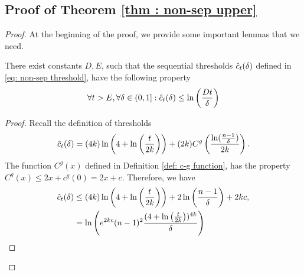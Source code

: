     


\subsection{Proof of Theorem \ref{thm : non-sep upper}}

\nonsepUpperBound*

\begin{proof}
        At the beginning of the proof, we provide some important lemmas that we need.
    


    
    \begin{lemma} \label{lem: thresholds upper bound}
        There exist constants $D,E$, such that the sequential thresholds $\hat{c}_t(\delta)$ defined in \eqref{eq: non-sep threshold}, have the following property
        \begin{align*}
            \forall t > E, \forall \delta \in (0,1]: \hat{c}_t(\delta) \leq \ln \left( \frac{Dt}{\delta} \right)
        \end{align*}
    \end{lemma}
    \begin{proof}
    Recall the definition of thresholds
    \begin{equation}
        \hat{c}_t(\delta) = (4k) \ln\left( 4 + \ln\left( \frac{t}{2k} \right)\right) + (2k) C^{g} \left( \frac{\ln(\frac{n-1}{\delta})}{2k} \right).
    \end{equation}
    The function $C^g(x)$ defined in Definition \ref{def: c-g function}, has the property $C^g(x) \leq 2x + c^g(0) = 2x + c$. Therefore, we have 
    \begin{align*}
        \hat{c}_t(\delta) &\leq (4k) \ln\left( 4 + \ln\left( \frac{t}{2k} \right)\right) + 2 \ln \left( \frac{n-1}{\delta}\right) + 2kc , \\
              &= \ln\left(e^{2kc}(n-1)^2 \frac{(4 + \ln\left( \frac{t}{2k} \right))^{4k}}{\delta}\right)
    \end{align*}


\end{proof}
\end{proof}

